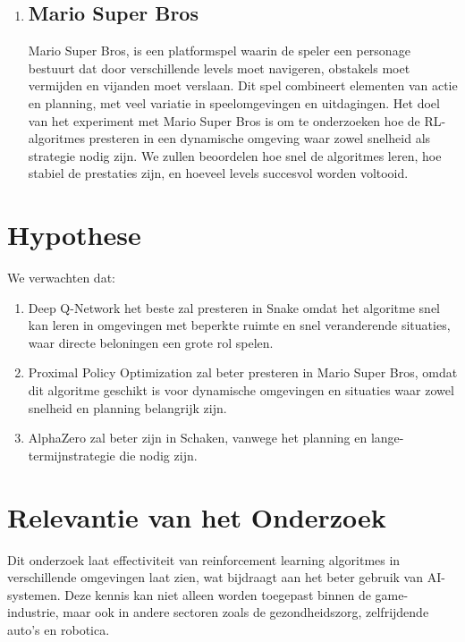 \documentclass[a4paper,12pt]{report}
\begin{document}
\begin{enumerate}
    \item\subsection*{Mario Super Bros}
          Mario Super Bros, is een platformspel waarin de speler een personage bestuurt
          dat door verschillende levels moet navigeren, obstakels moet vermijden en
          vijanden moet verslaan. Dit spel combineert elementen van actie en planning,
          met veel variatie in speelomgevingen en uitdagingen. Het doel van het
          experiment met Mario Super Bros is om te onderzoeken hoe de RL-algoritmes
          presteren in een dynamische omgeving waar zowel snelheid als strategie nodig
          zijn. We zullen beoordelen hoe snel de algoritmes leren, hoe stabiel de
          prestaties zijn, en hoeveel levels succesvol worden voltooid.
\end{enumerate}

\section{Hypothese}
We verwachten dat:
\begin{enumerate}
    \item Deep Q-Network het beste zal presteren in Snake omdat het algoritme snel kan
          leren in omgevingen met beperkte ruimte en snel veranderende situaties, waar
          directe beloningen een grote rol spelen.

    \item Proximal Policy Optimization zal beter presteren in Mario Super Bros, omdat dit
          algoritme geschikt is voor dynamische omgevingen en situaties waar zowel
          snelheid en planning belangrijk zijn.

    \item AlphaZero zal beter zijn in Schaken, vanwege het planning en
          lange-termijnstrategie die nodig zijn.

\end{enumerate}

\section{Relevantie van het Onderzoek}
Dit onderzoek laat effectiviteit van reinforcement learning algoritmes in
verschillende omgevingen laat zien, wat bijdraagt aan het beter gebruik van
AI-systemen. Deze kennis kan niet alleen worden toegepast binnen de
game-industrie, maar ook in andere sectoren zoals de gezondheidszorg,
zelfrijdende auto's en robotica.
\end{document}
